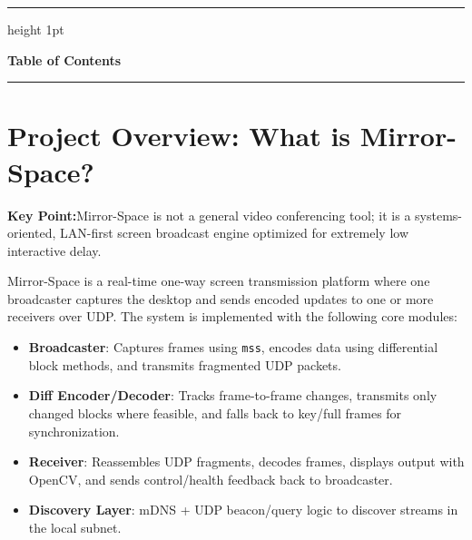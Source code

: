 \documentclass[12pt,a4paper]{article}
\begin{document}
\vspace{0.25cm}

{\color{iiitkgold}\hrule height 1pt}
\vspace{-3pt}
\noindent{\color{iiitkblue}\rule{\textwidth}{2pt}}

\newpage

\begin{center}
  {\LARGE\bfseries\color{iiitkblue} Table of Contents}\\[4pt]
  {\color{iiitkgold}\rule{0.6\textwidth}{1.2pt}}
\end{center}
\vspace{0.4cm}
\tableofcontents

\newpage


\section{Project Overview: What is Mirror-Space?}

\begin{tcolorbox}[colback=lightblue, colframe=iiitkblue, arc=5pt, boxrule=1pt]
\textbf{Key Point:}\enspace Mirror-Space is not a general video conferencing tool; it is a systems-oriented, LAN-first screen broadcast engine optimized for extremely low interactive delay.
\end{tcolorbox}

Mirror-Space is a real-time one-way screen transmission platform where one broadcaster captures the desktop and sends encoded updates to one or more receivers over UDP. The system is implemented with the following core modules:
\begin{itemize}[leftmargin=*, itemsep=4pt]
  \item \textbf{Broadcaster}: Captures frames using \texttt{mss}, encodes data using differential block methods, and transmits fragmented UDP packets.
  \item \textbf{Diff Encoder/Decoder}: Tracks frame-to-frame changes, transmits only changed blocks where feasible, and falls back to key/full frames for synchronization.
  \item \textbf{Receiver}: Reassembles UDP fragments, decodes frames, displays output with OpenCV, and sends control/health feedback back to broadcaster.
  \item \textbf{Discovery Layer}: mDNS + UDP beacon/query logic to discover streams in the local subnet.
\end{itemize}
\end{document}
